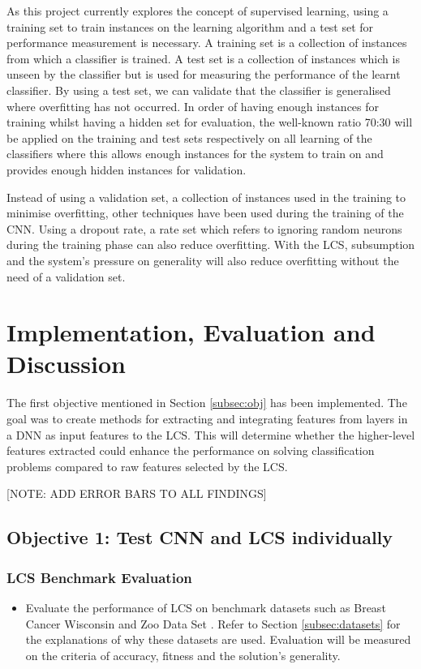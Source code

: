 As this project currently explores the concept of supervised learning, using a training set to train instances on the learning algorithm and a test set for performance measurement is necessary. A training set is a collection of instances from which a classifier is trained. A test set is a collection of instances which is unseen by the classifier but is used for measuring the performance of the learnt classifier. By using a test set, we can validate that the classifier is generalised where overfitting has not occurred. In order of having enough instances for training whilst having a hidden set for evaluation, the well-known ratio 70:30 will be applied on the training and test sets respectively on all learning of the classifiers where this allows enough instances for the system to train on and provides enough hidden instances for validation.

Instead of using a validation set, a collection of instances used in the training to minimise overfitting, other techniques have been used during the training of the CNN. Using a dropout rate, a rate set which refers to ignoring random neurons during the training phase can also reduce overfitting. With the LCS, subsumption and the system’s pressure on generality will also reduce overfitting without the need of a validation set.

\chapter{Implementation, Evaluation and Discussion}
The first objective mentioned in Section \ref{subsec:obj} has been implemented. The goal was to create methods for extracting and integrating features from layers in a DNN as input features to the LCS. This will determine whether the higher-level features extracted could enhance the performance on solving classification problems compared to raw features selected by the LCS. 

[NOTE: ADD ERROR BARS TO ALL FINDINGS]
\section{Objective 1: Test CNN and LCS individually}
\subsection{LCS Benchmark Evaluation} \label{subsec:bench}
\begin{itemize}
	\item Evaluate the performance of LCS on benchmark datasets such as Breast Cancer
	Wisconsin \cite{wisconsinbreast} and Zoo Data Set \cite{zoodata}. Refer to Section \ref{subsec:datasets} for the explanations of why these datasets are used. Evaluation will be measured on the criteria of
	accuracy, fitness and the solution’s generality.
\end{itemize}

